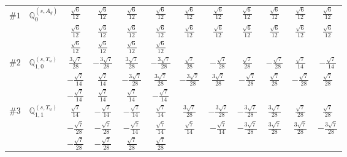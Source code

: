 \documentclass[fleqn,9pt,landscape]{jsarticle}
\begin{document}
\begin{center}
\begin{longtable}{lcccccccccc}
$ \#1\quad \mathbb{Q}_{0}^{(s,A_{g})} $ & $ \frac{\sqrt{6}}{12} $ & $ \frac{\sqrt{6}}{12} $ & $ \frac{\sqrt{6}}{12} $ & $ \frac{\sqrt{6}}{12} $ & $ \frac{\sqrt{6}}{12} $ & $ \frac{\sqrt{6}}{12} $ & $ \frac{\sqrt{6}}{12} $ & $ \frac{\sqrt{6}}{12} $ & $ \frac{\sqrt{6}}{12} $ & $ \frac{\sqrt{6}}{12} $ \\
& $ \frac{\sqrt{6}}{12} $ & $ \frac{\sqrt{6}}{12} $ & $ \frac{\sqrt{6}}{12} $ & $ \frac{\sqrt{6}}{12} $ & $ \frac{\sqrt{6}}{12} $ & $ \frac{\sqrt{6}}{12} $ & $ \frac{\sqrt{6}}{12} $ & $ \frac{\sqrt{6}}{12} $ & $ \frac{\sqrt{6}}{12} $ & $ \frac{\sqrt{6}}{12} $ \\
& $ \frac{\sqrt{6}}{12} $ & $ \frac{\sqrt{6}}{12} $ & $ \frac{\sqrt{6}}{12} $ & $ \frac{\sqrt{6}}{12} $ & $  $ & $  $ & $  $ & $  $ & $  $ & $  $ \\ \hline
$ \#2\quad \mathbb{Q}_{1,0}^{(s,T_{u})} $ & $ \frac{3 \sqrt{7}}{28} $ & $ - \frac{3 \sqrt{7}}{28} $ & $ \frac{3 \sqrt{7}}{28} $ & $ - \frac{3 \sqrt{7}}{28} $ & $ \frac{\sqrt{7}}{28} $ & $ - \frac{\sqrt{7}}{28} $ & $ \frac{\sqrt{7}}{28} $ & $ - \frac{\sqrt{7}}{28} $ & $ \frac{\sqrt{7}}{14} $ & $ - \frac{\sqrt{7}}{14} $ \\
& $ - \frac{\sqrt{7}}{14} $ & $ \frac{\sqrt{7}}{14} $ & $ - \frac{3 \sqrt{7}}{28} $ & $ \frac{3 \sqrt{7}}{28} $ & $ - \frac{3 \sqrt{7}}{28} $ & $ \frac{3 \sqrt{7}}{28} $ & $ - \frac{\sqrt{7}}{28} $ & $ \frac{\sqrt{7}}{28} $ & $ - \frac{\sqrt{7}}{28} $ & $ \frac{\sqrt{7}}{28} $ \\
& $ - \frac{\sqrt{7}}{14} $ & $ \frac{\sqrt{7}}{14} $ & $ \frac{\sqrt{7}}{14} $ & $ - \frac{\sqrt{7}}{14} $ & $  $ & $  $ & $  $ & $  $ & $  $ & $  $ \\ \hline
$ \#3\quad \mathbb{Q}_{1,1}^{(s,T_{u})} $ & $ \frac{\sqrt{7}}{14} $ & $ - \frac{\sqrt{7}}{14} $ & $ - \frac{\sqrt{7}}{14} $ & $ \frac{\sqrt{7}}{14} $ & $ \frac{3 \sqrt{7}}{28} $ & $ - \frac{3 \sqrt{7}}{28} $ & $ - \frac{3 \sqrt{7}}{28} $ & $ \frac{3 \sqrt{7}}{28} $ & $ \frac{\sqrt{7}}{28} $ & $ \frac{\sqrt{7}}{28} $ \\
& $ - \frac{\sqrt{7}}{28} $ & $ - \frac{\sqrt{7}}{28} $ & $ - \frac{\sqrt{7}}{14} $ & $ \frac{\sqrt{7}}{14} $ & $ \frac{\sqrt{7}}{14} $ & $ - \frac{\sqrt{7}}{14} $ & $ - \frac{3 \sqrt{7}}{28} $ & $ \frac{3 \sqrt{7}}{28} $ & $ \frac{3 \sqrt{7}}{28} $ & $ - \frac{3 \sqrt{7}}{28} $ \\
& $ - \frac{\sqrt{7}}{28} $ & $ - \frac{\sqrt{7}}{28} $ & $ \frac{\sqrt{7}}{28} $ & $ \frac{\sqrt{7}}{28} $ & $  $ & $  $ & $  $ & $  $ & $  $ & $  $ \\ \hline

\end{longtable}
\end{center}
\end{document}
